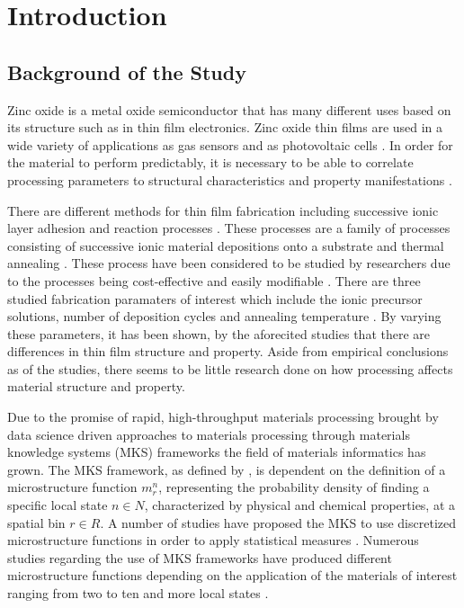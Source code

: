 \chapter{Introduction}
\section{Background of the Study}
Zinc oxide is a metal oxide semiconductor that has many different uses based on its structure such as in thin film electronics.
Zinc oxide thin films are used in a wide variety of applications as gas sensors \cite{florido17} and as photovoltaic cells \cite{fetsense}.
In order for the material to perform predictably, it is necessary to be able to correlate processing parameters to structural characteristics and property manifestations \cite{florido17, fetsense}.

There are different methods for thin film fabrication including successive ionic layer adhesion and reaction processes \cite{florido17}.
These processes are a family of processes consisting of successive ionic material depositions onto a substrate and thermal annealing \cite{gao08}.
These process have been considered to be studied by researchers due to the processes being cost-effective and easily modifiable \cite{gao08, vargas08, vargas2}.
There are three studied fabrication paramaters of interest which include the ionic precursor solutions, number of deposition cycles and annealing temperature \cite{gao08, vargas08}.
By varying these parameters, it has been shown, by the aforecited studies that there are differences in thin film structure and property.
Aside from empirical conclusions as of the studies, there seems to be little research done on how processing affects material structure and property.

Due to the promise of rapid, high-throughput materials processing brought by data science driven approaches to materials processing through materials knowledge systems (MKS) frameworks \cite{gupta15, sun17, yabansu14} the field of materials informatics has grown.
The MKS framework, as defined by , is dependent on the definition of a microstructure function $m_r^n$, representing the probability density of finding a specific local state $n \in N$, characterized by physical and chemical properties, at a spatial bin $r \in R$.
A number of studies have proposed the MKS to use discretized microstructure functions in order to apply statistical measures \cite{gupta15, sun17, yabansu14}.
Numerous studies regarding the use of MKS frameworks have produced different microstructure functions depending on the application of the materials of interest ranging from two to ten and more local states \cite{gupta15, sun17, yabansu14}. 

